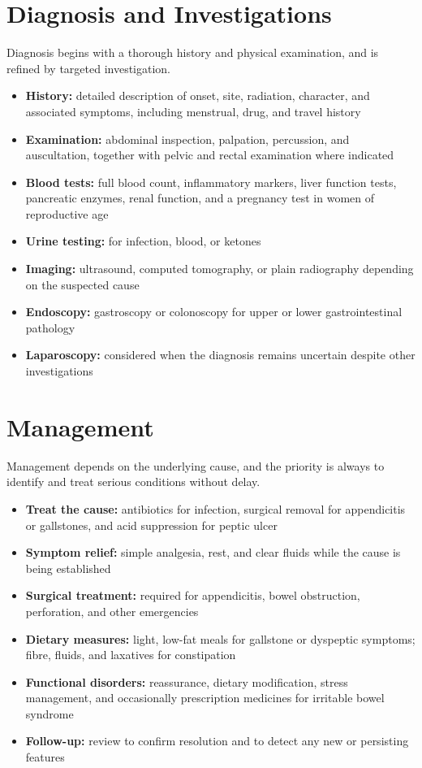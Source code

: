 \section*{Diagnosis and Investigations}
Diagnosis begins with a thorough history and physical examination, and is refined by targeted investigation.

\begin{itemize}
    \item \textbf{History:} detailed description of onset, site, radiation, character, and associated symptoms, including menstrual, drug, and travel history
    \item \textbf{Examination:} abdominal inspection, palpation, percussion, and auscultation, together with pelvic and rectal examination where indicated
    \item \textbf{Blood tests:} full blood count, inflammatory markers, liver function tests, pancreatic enzymes, renal function, and a pregnancy test in women of reproductive age
    \item \textbf{Urine testing:} for infection, blood, or ketones
    \item \textbf{Imaging:} ultrasound, computed tomography, or plain radiography depending on the suspected cause
    \item \textbf{Endoscopy:} gastroscopy or colonoscopy for upper or lower gastrointestinal pathology
    \item \textbf{Laparoscopy:} considered when the diagnosis remains uncertain despite other investigations
\end{itemize}

\section*{Management}
Management depends on the underlying cause, and the priority is always to identify and treat serious conditions without delay.

\begin{itemize}
    \item \textbf{Treat the cause:} antibiotics for infection, surgical removal for appendicitis or gallstones, and acid suppression for peptic ulcer
    \item \textbf{Symptom relief:} simple analgesia, rest, and clear fluids while the cause is being established
    \item \textbf{Surgical treatment:} required for appendicitis, bowel obstruction, perforation, and other emergencies
    \item \textbf{Dietary measures:} light, low-fat meals for gallstone or dyspeptic symptoms; fibre, fluids, and laxatives for constipation
    \item \textbf{Functional disorders:} reassurance, dietary modification, stress management, and occasionally prescription medicines for irritable bowel syndrome
    \item \textbf{Follow-up:} review to confirm resolution and to detect any new or persisting features
\end{itemize}

